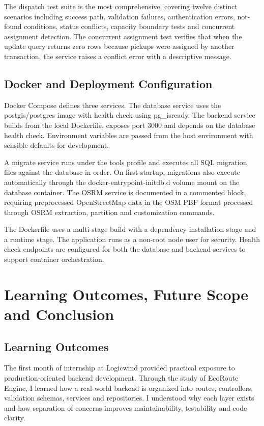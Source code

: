 \documentclass[12pt,a4paper]{report}
\newcommand{\chapterheader}{CHAPTER HEADING}
\begin{document}
The dispatch test suite is the most comprehensive, covering twelve distinct scenarios including success path, validation failures, authentication errors, not-found conditions, status conflicts, capacity boundary tests and concurrent assignment detection. The concurrent assignment test verifies that when the update query returns zero rows because pickups were assigned by another transaction, the service raises a conflict error with a descriptive message.

\section{Docker and Deployment Configuration}
Docker Compose defines three services. The database service uses the postgis/postgres image with health check using pg\_isready. The backend service builds from the local Dockerfile, exposes port 3000 and depends on the database health check. Environment variables are passed from the host environment with sensible defaults for development.

A migrate service runs under the tools profile and executes all SQL migration files against the database in order. On first startup, migrations also execute automatically through the docker-entrypoint-initdb.d volume mount on the database container. The OSRM service is documented in a commented block, requiring preprocessed OpenStreetMap data in the OSM PBF format processed through OSRM extraction, partition and customization commands.

The Dockerfile uses a multi-stage build with a dependency installation stage and a runtime stage. The application runs as a non-root node user for security. Health check endpoints are configured for both the database and backend services to support container orchestration.

\clearpage

\renewcommand{\chapterheader}{CHAPTER 5}
\chapter{Learning Outcomes, Future Scope and Conclusion}

\section{Learning Outcomes}
The first month of internship at Logicwind provided practical exposure to production-oriented backend development. Through the study of EcoRoute Engine, I learned how a real-world backend is organized into routes, controllers, validation schemas, services and repositories. I understood why each layer exists and how separation of concerns improves maintainability, testability and code clarity.
\end{document}

